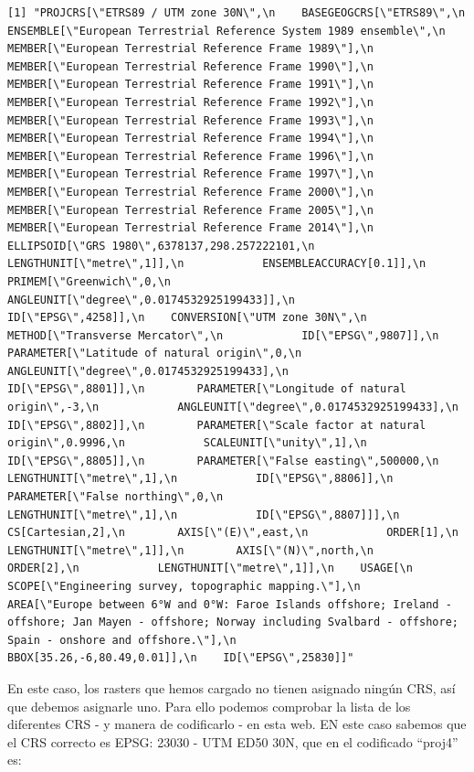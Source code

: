 \documentclass[
  letterpaper,
  DIV=11,
  numbers=noendperiod]{scrreprt}
\begin{document}
\begin{verbatim}
[1] "PROJCRS[\"ETRS89 / UTM zone 30N\",\n    BASEGEOGCRS[\"ETRS89\",\n        ENSEMBLE[\"European Terrestrial Reference System 1989 ensemble\",\n            MEMBER[\"European Terrestrial Reference Frame 1989\"],\n            MEMBER[\"European Terrestrial Reference Frame 1990\"],\n            MEMBER[\"European Terrestrial Reference Frame 1991\"],\n            MEMBER[\"European Terrestrial Reference Frame 1992\"],\n            MEMBER[\"European Terrestrial Reference Frame 1993\"],\n            MEMBER[\"European Terrestrial Reference Frame 1994\"],\n            MEMBER[\"European Terrestrial Reference Frame 1996\"],\n            MEMBER[\"European Terrestrial Reference Frame 1997\"],\n            MEMBER[\"European Terrestrial Reference Frame 2000\"],\n            MEMBER[\"European Terrestrial Reference Frame 2005\"],\n            MEMBER[\"European Terrestrial Reference Frame 2014\"],\n            ELLIPSOID[\"GRS 1980\",6378137,298.257222101,\n                LENGTHUNIT[\"metre\",1]],\n            ENSEMBLEACCURACY[0.1]],\n        PRIMEM[\"Greenwich\",0,\n            ANGLEUNIT[\"degree\",0.0174532925199433]],\n        ID[\"EPSG\",4258]],\n    CONVERSION[\"UTM zone 30N\",\n        METHOD[\"Transverse Mercator\",\n            ID[\"EPSG\",9807]],\n        PARAMETER[\"Latitude of natural origin\",0,\n            ANGLEUNIT[\"degree\",0.0174532925199433],\n            ID[\"EPSG\",8801]],\n        PARAMETER[\"Longitude of natural origin\",-3,\n            ANGLEUNIT[\"degree\",0.0174532925199433],\n            ID[\"EPSG\",8802]],\n        PARAMETER[\"Scale factor at natural origin\",0.9996,\n            SCALEUNIT[\"unity\",1],\n            ID[\"EPSG\",8805]],\n        PARAMETER[\"False easting\",500000,\n            LENGTHUNIT[\"metre\",1],\n            ID[\"EPSG\",8806]],\n        PARAMETER[\"False northing\",0,\n            LENGTHUNIT[\"metre\",1],\n            ID[\"EPSG\",8807]]],\n    CS[Cartesian,2],\n        AXIS[\"(E)\",east,\n            ORDER[1],\n            LENGTHUNIT[\"metre\",1]],\n        AXIS[\"(N)\",north,\n            ORDER[2],\n            LENGTHUNIT[\"metre\",1]],\n    USAGE[\n        SCOPE[\"Engineering survey, topographic mapping.\"],\n        AREA[\"Europe between 6°W and 0°W: Faroe Islands offshore; Ireland - offshore; Jan Mayen - offshore; Norway including Svalbard - offshore; Spain - onshore and offshore.\"],\n        BBOX[35.26,-6,80.49,0.01]],\n    ID[\"EPSG\",25830]]"
\end{verbatim}

En este caso, los rasters que hemos cargado no tienen asignado ningún
CRS, así que debemos asignarle uno. Para ello podemos comprobar la lista
de los diferentes CRS - y manera de codificarlo - en esta web. EN este
caso sabemos que el CRS correcto es EPSG: 23030 - UTM ED50 30N, que en
el codificado ``proj4'' es:
\end{document}
